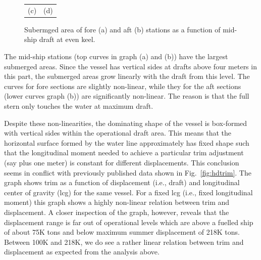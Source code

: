 \documentclass[runningheads]{llncs}
\begin{document}
\begin{figure}[h!]
\begin{tabular}{cc}
          (c)                              &                     (d)   
  \end{tabular}
  \caption{Subermged area of fore (a) and aft (b) stations as a function of mid-ship draft at even keel.}\label{fig:Bonjean}
\end{figure}

The mid-ship stations (top curves in graph (a) and (b)) have the largest submerged areas. Since the vessel has vertical sides at drafts above four meters in this part, the submerged areas grow linearly with the draft from this level. The curves for fore sections are slightly non-linear, while they for the aft sections (lower curves graph (b)) are significantly non-linear. The reason is that the full stern only touches the water at maximum draft. 

Despite these non-linearities, the dominating shape of the vessel is box-formed with vertical sides within the operational draft area. This means that the horizontal surface formed by the water line approximately has fixed shape such that the longitudinal moment needed to achieve a particular trim adjustment (say plus one meter) is constant for different displacements. This conclusion seems in conflict with previously published data shown in Fig.~\ref{fig:hdtrim}. The graph shows trim as a function of displacement (i.e., draft) and longitudinal center of gravity (lcg) for the same vessel. For a fixed lcg (i.e., fixed longitudinal moment) this graph shows a highly non-linear relation between trim and displacement. A closer inspection of the graph, however, reveals that the displacement range is far out of operational levels which are above a fuelled ship of about 75K tons and below maximum summer displacement of 218K tons. Between 100K and 218K, we do see a rather linear relation between trim and displacement as expected from the analysis above.  
\end{document}
